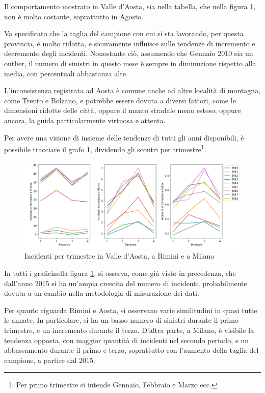\documentclass[a4paper,12pt]{report}
\begin{document}
Il comportamento mostrato in Valle d'Aosta, sia nella tabella, 
che nella figura \ref{fig:aosta-rimini-milano-trimestre}, non è molto costante, 
soprattutto in Agosto. 

Va specificato che la taglia del campione con cui si sta lavorando, per questa provincia, 
è molto ridotta, e sicuramente influisce sulle tendenze di incremento e decremento 
degli incidenti. 
Nonostante ciò, assumendo che Gennaio 2010 sia un outlier, il numero di sinistri in 
questo mese è sempre in diminuzione rispetto alla media, con percentuali abbastanza alte. 

L'inconsistenza registrata ad Aosta è comune anche ad altre località di montagna, come Trento e 
Bolzano, e potrebbe essere dovuta a diversi fattori, come 
le dimensioni ridotte delle città, oppure il manto stradale meno esteso, oppure ancora, 
la guida particolarmente virtuosa e attenta.

Per avere una visione di insieme delle tendenze di tutti gli anni disponibili, 
è possibile tracciare 
il grafo \ref{fig:aosta-rimini-milano-trimestre}, dividendo gli scontri 
per trimestre\footnote{Per primo trimestre si intende Gennaio, Febbraio e Marzo ecc.}. 

\begin{figure}
    \includegraphics[width=\linewidth]{../src/incidenti/incidenti_senza_coords/mese_incidenti/trimestri_aosta_milano_rimini.png}
    \caption{Incidenti per trimestre in Valle d'Aosta, a Rimini e a Milano}
    \label{fig:aosta-rimini-milano-trimestre}
\end{figure}

In tutti i graficinella figura \ref{fig:aosta-rimini-milano-trimestre}, 
si osserva, come già visto in precedenza, che dall'anno 2015 si ha un'ampia crescita  
del numero di incidenti, probabilmente dovuta a un cambio 
nella metodologia di misurazione dei dati. 

Per quanto riguarda Rimini e Aosta, si osservano varie similitudini in quasi 
tutte le annate. 
In particolare, si ha un basso numero di sinistri 
durante il primo trimestre, e un incremento durante il terzo. 
D'altra parte, a Milano, è visibile la tendenza opposta, con maggior quantità di 
incidenti nel secondo periodo, e un abbassamento durante il primo 
e terzo, soprattutto con l'aumento della taglia del campione, 
a partire dal 2015. 
\end{document}
